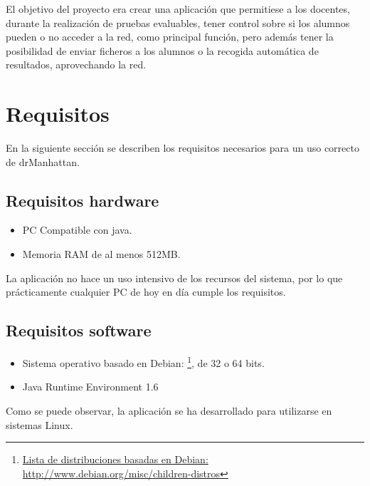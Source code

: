 \documentclass[a4paper,11pt]{article}
\begin{document}
El objetivo del proyecto era crear una aplicación que permitiese a los docentes, durante la realización de pruebas evaluables, tener control sobre si los alumnos pueden o no acceder a la red, como principal función, pero además tener la posibilidad de enviar ficheros a los alumnos o la recogida automática de resultados, aprovechando la red.

\newpage

\section{Requisitos}

En la siguiente sección se describen los requisitos necesarios para un uso correcto de drManhattan.

\subsection{Requisitos hardware}

\begin{itemize}

    \item PC Compatible con java.

    \item Memoria RAM de al menos 512MB.

\end{itemize}

La aplicación no hace un uso intensivo de los recursos del sistema, por lo que prácticamente cualquier PC de hoy en día cumple los requisitos.


\subsection{Requisitos software}

\begin{itemize}

    \item Sistema operativo basado en Debian: \footnote{\href{http://www.debian.org/misc/children-distros}{Lista de distribuciones basadas en Debian: http://www.debian.org/misc/children-distros}}, de 32 o 64 bits.

    \item Java Runtime Environment 1.6

\end{itemize}

Como se puede observar, la aplicación se ha desarrollado para utilizarse en sistemas Linux.
\end{document}
